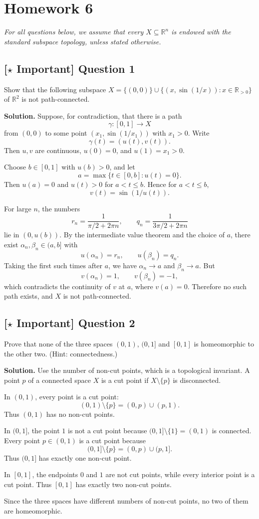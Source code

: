 \documentclass{article}
\newcommand{\R}{\mathbb{R}}
\newcommand{\important}{\texorpdfstring{\textbf{[\(\star\) Important]}}{[Important]}}
\newenvironment{solution}{\par\noindent\textbf{Solution.}\quad}{\par}
\begin{document}
\section{Homework 6}

\textit{For all questions below, we assume that every $X \subseteq \R^n$ is endowed with the standard subspace topology, unless stated otherwise.}

\subsection{\important{} Question 1}
Show that the following subspace $X = \{(0,0)\} \cup \{(x,\sin(1/x)) : x \in \R_{>0}\}$ of $\R^2$ is not path-connected.

\begin{solution}
Suppose, for contradiction, that there is a path
\[
  \gamma:[0,1]\to X
\]
from $(0,0)$ to some point $(x_1,\sin(1/x_1))$ with $x_1>0$. Write
\[
  \gamma(t)=(u(t),v(t)).
\]
Then $u,v$ are continuous, $u(0)=0$, and $u(1)=x_1>0$.

Choose $b\in[0,1]$ with $u(b)>0$, and let
\[
  a=\max\{t\in[0,b]:u(t)=0\}.
\]
Then $u(a)=0$ and $u(t)>0$ for $a<t\le b$. Hence for $a<t\le b$,
\[
  v(t)=\sin(1/u(t)).
\]

For large $n$, the numbers
\[
  r_n=\frac1{\pi/2+2\pi n},
  \qquad
  q_n=\frac1{3\pi/2+2\pi n}
\]
lie in $(0,u(b))$. By the intermediate value theorem and the choice of
$a$, there exist $\alpha_n,\beta_n\in(a,b]$ with
\[
  u(\alpha_n)=r_n,\qquad u(\beta_n)=q_n.
\]
Taking the first such times after $a$, we have
$\alpha_n\to a$ and $\beta_n\to a$.
But
\[
  v(\alpha_n)=1,\qquad v(\beta_n)=-1,
\]
which contradicts the continuity of $v$ at $a$, where
$v(a)=0$. Therefore no such path exists, and $X$ is not path-connected.
\end{solution}

\subsection{\important{} Question 2}
Prove that none of the three spaces $(0,1)$, $(0,1]$ and $[0,1]$ is homeomorphic to the other two. (Hint: connectedness.)

\begin{solution}
Use the number of non-cut points, which is a topological invariant. A
point $p$ of a connected space $X$ is a cut point if $X\setminus\{p\}$ is
disconnected.

In $(0,1)$, every point is a cut point:
\[
  (0,1)\setminus\{p\}=(0,p)\cup(p,1).
\]
Thus $(0,1)$ has no non-cut points.

In $(0,1]$, the point $1$ is not a cut point because
$(0,1]\setminus\{1\}=(0,1)$ is connected. Every point $p\in(0,1)$ is a
cut point because
\[
  (0,1]\setminus\{p\}=(0,p)\cup(p,1].
\]
Thus $(0,1]$ has exactly one non-cut point.

In $[0,1]$, the endpoints $0$ and $1$ are not cut points, while every
interior point is a cut point. Thus $[0,1]$ has exactly two non-cut
points.

Since the three spaces have different numbers of non-cut points, no two
of them are homeomorphic.
\end{solution}
\end{document}
